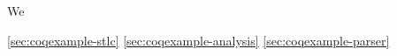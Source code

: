 We 

\bigskip 

\cref{sec:coqexample-stlc}
\cref{sec:coqexample-analysis}
\cref{sec:coqexample-parser}